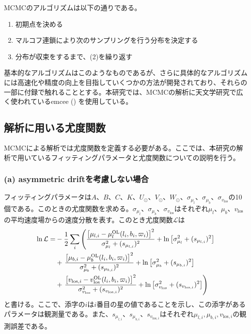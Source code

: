 MCMCのアルゴリズムは以下の通りである。
\begin{enumerate}
	\item{初期点を決める}
	\item{マルコフ連鎖により次のサンプリングを行う分布を決定する}
	\item{分布が収束をするまで、(2)を繰り返す}
\end{enumerate}
基本的なアルゴリズムはこのようなものであるが、さらに具体的なアルゴリズムには高速化や精度の向上を目指していくつかの方法が開発されており、それらの一部に付録で触れることとする。本研究では、MCMCの解析に天文学研究で広く使われているemcee (\cite{Foreman2013}) を使用している。


\subsection{解析に用いる尤度関数 \label{解析に用いる尤度関数}}
MCMCによる解析では尤度関数を定義する必要がある。ここでは、本研究の解析で用いているフィッティングパラメータと尤度関数についての説明を行う。

\subsubsection{(a) asymmetric driftを考慮しない場合}
フィッティングパラメータは$A、B、C、K、U_{\odot}、V_{\odot}、W_{\odot}、\sigma_{\mu_l}、\sigma_{\mu_b}、\sigma_{v_{\mathrm{los}}}$の10個である。このときの尤度関数を求める。$\sigma_{\mu_l}、\sigma_{\mu_b}、\sigma_{v_{\mathrm{los}}}$はそれぞれ$\mu_l、\mu_b、v_{\mathrm{los}}$の平均速度場からの速度分散を表す。このとき尤度関数$\mathcal{L}$は
\begin{align}
\begin{aligned}
	\ln \mathcal{L} =& -\frac{1}{2}\sum_i \left(\frac{\left[\mu_{l,i} - \mu_l^{\mathrm{OL}}(l_i,b_i,\varpi_i)\right]^2}{\sigma_{\mu_l}^2 + (s_{\mu_{l,i}})^2}  + {\rm ln}\left[\sigma_{\mu_l}^2 + (s_{\mu_{l,i}})^2\right] \right. \\
	&+ \left. \frac{\left[\mu_{b,i} - \mu_b^{\mathrm{OL}}(l_i,b_i,\varpi_i)\right]^2}{\sigma_{\mu_b}^2 + (s_{\mu_{b,i}})^2}  + {\rm ln}\left[\sigma_{\mu_b}^2 + (s_{\mu_{b,i}})^2\right] \right. \\
	&+ \left. \frac{\left[v_{\mathrm{los},i} - v^{\mathrm{OL}}_{\mathrm{los}}(l_i,b_i,\varpi_i)\right]^2}{\sigma_{v_{\mathrm{los}}}^2 + (s_{v_{\mathrm{los},i}})^2} + {\rm ln}\left[\sigma_{v_{\mathrm{los}}}^2 + (s_{v_{\mathrm{los},i}})^2\right] \right)
\end{aligned} \label{Likelihood_Mock}
\end{align}
と書ける。ここで、添字の$i$は$i$番目の星の値であることを示し、この添字があるパラメータは観測量である。また、$s_{\mu_{l,i}}、s_{\mu_{b,i}}、s_{v_{\mathrm{los},i}}$はそれぞれ$\mu_{l,i},\mu_{b,i},v_{\mathrm{los},i}$の観測誤差である。

